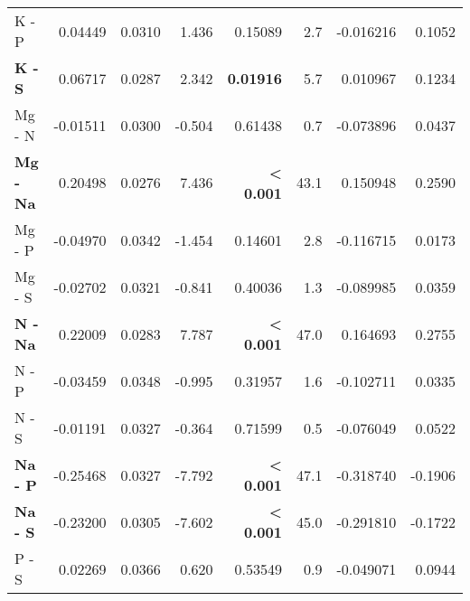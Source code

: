 \begin{table}[H]
\begin{tabular}[t]{>{}lrrr>{}rrrr}
K - P & 0.04449 & 0.0310 & 1.436 & 0.15089 & 2.7 & -0.016216 & 0.1052\\
\textbf{K - S} & 0.06717 & 0.0287 & 2.342 & \textbf{0.01916} & 5.7 & 0.010967 & 0.1234\\
Mg - N & -0.01511 & 0.0300 & -0.504 & 0.61438 & 0.7 & -0.073896 & 0.0437\\
\textbf{Mg - Na} & 0.20498 & 0.0276 & 7.436 & \textbf{< 0.001} & 43.1 & 0.150948 & 0.2590\\
Mg - P & -0.04970 & 0.0342 & -1.454 & 0.14601 & 2.8 & -0.116715 & 0.0173\\
Mg - S & -0.02702 & 0.0321 & -0.841 & 0.40036 & 1.3 & -0.089985 & 0.0359\\
\textbf{N - Na} & 0.22009 & 0.0283 & 7.787 & \textbf{< 0.001} & 47.0 & 0.164693 & 0.2755\\
N - P & -0.03459 & 0.0348 & -0.995 & 0.31957 & 1.6 & -0.102711 & 0.0335\\
N - S & -0.01191 & 0.0327 & -0.364 & 0.71599 & 0.5 & -0.076049 & 0.0522\\
\textbf{Na - P} & -0.25468 & 0.0327 & -7.792 & \textbf{< 0.001} & 47.1 & -0.318740 & -0.1906\\
\textbf{Na - S} & -0.23200 & 0.0305 & -7.602 & \textbf{< 0.001} & 45.0 & -0.291810 & -0.1722\\
P - S & 0.02269 & 0.0366 & 0.620 & 0.53549 & 0.9 & -0.049071 & 0.0944\\
\bottomrule
\end{tabular}
\end{table}
